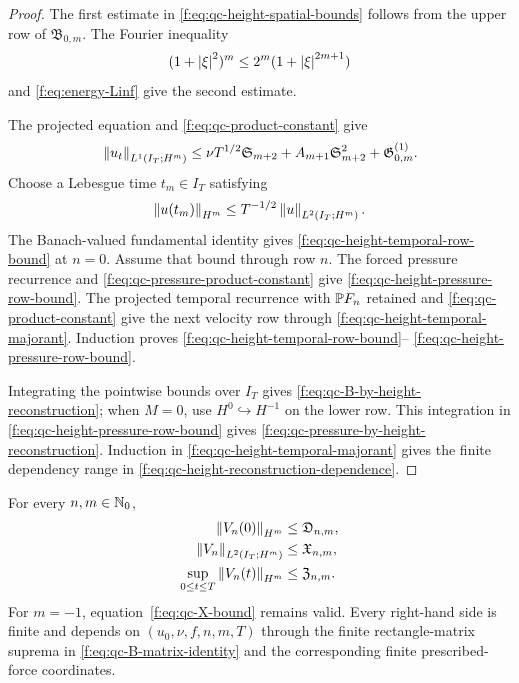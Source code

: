 \begin{proof}
The first estimate in \eqref{f:eq:qc-height-spatial-bounds} follows from the
upper row of \(\mathfrak B_{0,m}\).  The Fourier inequality
\[
 (1+\left|\xi\right|^2)^m\le2^m(1+\left|\xi\right|^{2m+1})
\]
and \eqref{f:eq:energy-Linf} give the second estimate.

The projected equation and \eqref{f:eq:qc-product-constant} give
\[
 \left\lVert u_t\right\rVert_{L^1(I_T;H^m)}
 \le\nu T^{1/2}\mathfrak S_{m+2}
 +A_{m+1}\mathfrak S_{m+2}^2
 +\mathfrak G^{(1)}_{0,m}.
\]
Choose a Lebesgue time \(t_m\in I_T\) satisfying
\[
 \left\lVert u(t_m)\right\rVert_{H^m}
 \le T^{-1/2}\left\lVert u\right\rVert_{L^2(I_T;H^m)}.
\]
The Banach-valued fundamental identity gives
\eqref{f:eq:qc-height-temporal-row-bound} at \(n=0\).
Assume that bound through row \(n\).  The forced pressure recurrence and
\eqref{f:eq:qc-pressure-product-constant} give
\eqref{f:eq:qc-height-pressure-row-bound}.  The projected temporal recurrence
with \(\mathbb P F_n\) retained and \eqref{f:eq:qc-product-constant} give the next velocity row through
\eqref{f:eq:qc-height-temporal-majorant}.  Induction proves
\eqref{f:eq:qc-height-temporal-row-bound}--%
\eqref{f:eq:qc-height-pressure-row-bound}.

Integrating the pointwise bounds over \(I_T\) gives
\eqref{f:eq:qc-B-by-height-reconstruction}; when \(M=0\), use
\(H^0\hookrightarrow H^{-1}\) on the lower row.  This integration in
\eqref{f:eq:qc-height-pressure-row-bound} gives
\eqref{f:eq:qc-pressure-by-height-reconstruction}.  Induction in
\eqref{f:eq:qc-height-temporal-majorant} gives the finite dependency range in
\eqref{f:eq:qc-height-reconstruction-dependence}.
\end{proof}

\begin{lemma}
\label{f:lem:qc-closed-velocity-majorants}
For every \(n,m\in\mathbb N_0\),
\begin{align}
 \left\lVert V_n(0)\right\rVert_{H^m}&\le\mathfrak D_{n,m},
 \label{f:eq:qc-D-bound}\\
 \left\lVert V_n\right\rVert_{L^2(I_T;H^m)}&\le\mathfrak X_{n,m},
 \label{f:eq:qc-X-bound}\\
 \sup_{0\le t\le T}\left\lVert V_n(t)\right\rVert_{H^m}
 &\le\mathfrak Z_{n,m}.
 \label{f:eq:qc-Z-bound}
\end{align}
For \(m=-1\), equation~\eqref{f:eq:qc-X-bound} remains valid.  Every
right-hand side is finite and depends on \((u_0,\nu,f,n,m,T)\) through the
finite rectangle-matrix suprema in \eqref{f:eq:qc-B-matrix-identity} and the
corresponding finite prescribed-force coordinates.
\end{lemma}

